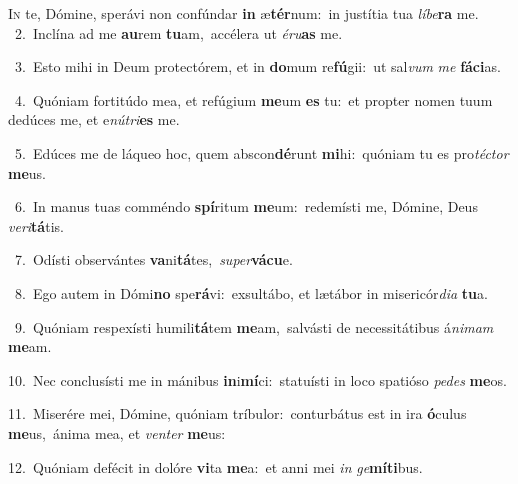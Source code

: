 \lettrine{\initial\textcolor{\initialcolor}{I}}{n} te, Dómine, sperávi non confúndar \textbf{in} æ\-\textbf{tér}\-num:~\star in justítia tua \textit{lí}\-\textit{be}\textbf{ra} me.\\
{\numbfont\textcolor{\numbcolor}{~2.}}~Inclína ad me \textbf{au}\-rem \textbf{tu}\-am,~\star accélera ut \textit{é}\-\textit{ru}\textbf{as} me.\par
{\numbfont\textcolor{\numbcolor}{~3.}}~Esto mihi in Deum protectórem, et in \textbf{do}\-mum re\-\textbf{fú}\-gii:~\star ut sal\textit{vum} \textit{me} \textbf{fá}\-\textbf{ci}as.\par
{\numbfont\textcolor{\numbcolor}{~4.}}~Quóniam fortitúdo mea, et refúgium \textbf{me}\-um \textbf{es} tu:~\star et propter nomen tuum dedúces me, et e\-\textit{nú}\-\textit{tri}\textbf{es} me.\par
{\numbfont\textcolor{\numbcolor}{~5.}}~Edúces me de láqueo hoc, quem abscon\-\textbf{dé}\-runt \textbf{mi}\-hi:~\star quóniam tu es pro\-\textit{téc}\-\textit{tor} \textbf{me}\-us.\par
{\numbfont\textcolor{\numbcolor}{~6.}}~In manus tuas comméndo \textbf{spí}\-ritum \textbf{me}\-um:~\star redemísti me, Dómine, Deus \textit{ve}\-\textit{ri}\textbf{tá}tis.\par
{\numbfont\textcolor{\numbcolor}{~7.}}~Odísti observántes \textbf{va}\-ni\-\textbf{tá}\-tes,~\star \textit{su}\-\textit{per}\textbf{vá}\textbf{cu}e.\par
{\numbfont\textcolor{\numbcolor}{~8.}}~Ego autem in Dómi\textbf{no} spe\-\textbf{rá}\-vi:~\star exsultábo, et lætábor in misericór\-\textit{di}\-\textit{a} \textbf{tu}\-a.\par
{\numbfont\textcolor{\numbcolor}{~9.}}~Quóniam respexísti humili\-\textbf{tá}\-tem \textbf{me}\-am,~\star salvásti de necessitátibus á\-\textit{ni}\-\textit{mam} \textbf{me}\-am.\par
{\numbfont\textcolor{\numbcolor}{10.}}~Nec conclusísti me in mánibus \textbf{in}\-i\-\textbf{mí}\-ci:~\star statuísti in loco spatióso \textit{pe}\-\textit{des} \textbf{me}\-os.\par
{\numbfont\textcolor{\numbcolor}{11.}}~Miserére mei, Dómine, quóniam tríbulor:~\dagger conturbátus est in ira \textbf{ó}\-culus \textbf{me}\-us,~\star ánima mea, et \textit{ven}\-\textit{ter} \textbf{me}\-us:\par
{\numbfont\textcolor{\numbcolor}{12.}}~Quóniam defécit in dolóre \textbf{vi}\-ta \textbf{me}\-a:~\star et anni mei \textit{in} \textit{ge}\-\textbf{mí}\textbf{ti}bus.\par
